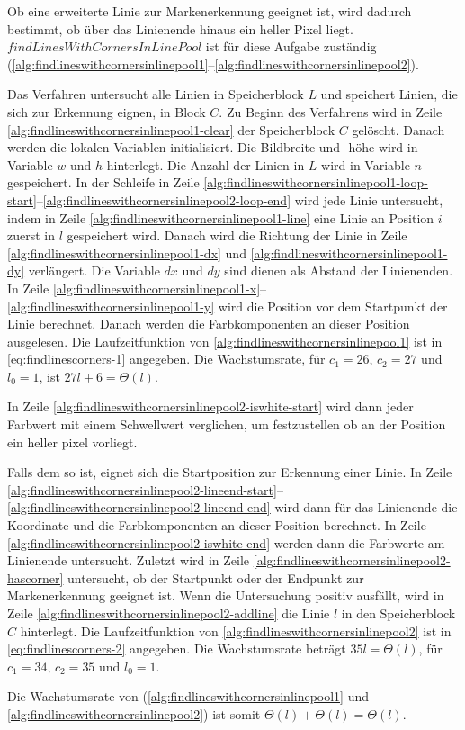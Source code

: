 Ob eine erweiterte Linie zur Markenerkennung geeignet ist, wird dadurch bestimmt, ob über das Linienende hinaus ein
 heller Pixel liegt. $\mathit{findLinesWithCornersInLinePool}$ ist für diese Aufgabe zuständig
(\autoref{alg:findlineswithcornersinlinepool1}--\autoref{alg:findlineswithcornersinlinepool2}).

Das Verfahren untersucht alle Linien in Speicherblock $L$ und speichert Linien, die sich zur Erkennung eignen, in Block
 $C$. Zu Beginn des Verfahrens wird in Zeile \ref{alg:findlineswithcornersinlinepool1-clear} der Speicherblock $C$
 gelöscht. Danach werden die lokalen Variablen initialisiert. Die Bildbreite und -höhe wird in Variable $w$ und $h$
 hinterlegt. Die Anzahl der Linien in $L$ wird in Variable $n$ gespeichert. In der Schleife in Zeile
 \ref{alg:findlineswithcornersinlinepool1-loop-start}--\ref{alg:findlineswithcornersinlinepool2-loop-end} wird jede
 Linie untersucht, indem in Zeile \ref{alg:findlineswithcornersinlinepool1-line} eine Linie an Position $i$ zuerst in
 $l$ gespeichert wird. Danach wird die Richtung der Linie in Zeile \ref{alg:findlineswithcornersinlinepool1-dx} und
 \ref{alg:findlineswithcornersinlinepool1-dy} verlängert. Die Variable $dx$ und $dy$ sind dienen als Abstand der
 Linienenden. In Zeile \ref{alg:findlineswithcornersinlinepool1-x}--\ref{alg:findlineswithcornersinlinepool1-y} wird
 die Position vor dem Startpunkt der Linie berechnet. Danach werden die Farbkomponenten an dieser Position ausgelesen.
 Die Laufzeitfunktion von \autoref{alg:findlineswithcornersinlinepool1} ist in \autoref{eq:findlinescorners-1}
 angegeben. Die Wachstumsrate, für $c_{1} = 26$, $c_{2} = 27$ und $l_{0} = 1$, ist $27l + 6 = \Theta(l)$.

In Zeile \ref{alg:findlineswithcornersinlinepool2-iswhite-start} wird dann jeder Farbwert mit einem Schwellwert
 verglichen, um festzustellen ob an der Position ein heller \gls{pixel} vorliegt.

Falls dem so ist, eignet sich die Startposition zur Erkennung einer Linie. In Zeile
 \ref{alg:findlineswithcornersinlinepool2-lineend-start}--\ref{alg:findlineswithcornersinlinepool2-lineend-end} wird
 dann für das Linienende die Koordinate und die Farbkomponenten an dieser Position berechnet. In Zeile
 \ref{alg:findlineswithcornersinlinepool2-iswhite-end} werden dann die Farbwerte am Linienende untersucht. Zuletzt wird
 in Zeile \ref{alg:findlineswithcornersinlinepool2-hascorner} untersucht, ob der Startpunkt oder der Endpunkt zur
 Markenerkennung geeignet ist. Wenn die Untersuchung positiv ausfällt, wird in Zeile
 \ref{alg:findlineswithcornersinlinepool2-addline} die Linie $l$ in den Speicherblock $C$ hinterlegt. Die
 Laufzeitfunktion von \autoref{alg:findlineswithcornersinlinepool2} ist in \autoref{eq:findlinescorners-2} angegeben.
 Die Wachstumsrate beträgt $35l = \Theta(l)$, für $c_{1}=34$, $c_{2}=35$ und $l_{0}=1$.

Die Wachstumsrate von 
 (\autoref{alg:findlineswithcornersinlinepool1} und \autoref{alg:findlineswithcornersinlinepool2}) ist somit
 $\Theta(l) + \Theta(l) = \Theta(l)$.


